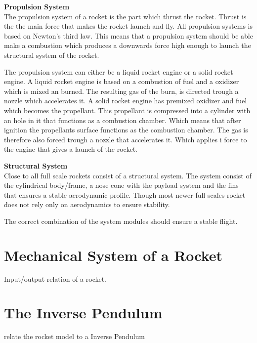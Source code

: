 \textbf{Propulsion System}\\
The propulsion system of a rocket is the part which thrust the rocket. Thrust is the the main force that makes the rocket launch and fly. All propulsion systems is based on Newton's third law. This means that a propulsion system should be able make a combustion which produces a downwards force high enough to launch the structural system of the rocket.


The propulsion system can either be a liquid rocket engine or a solid rocket engine. A liquid rocket engine is based on a combustion of fuel and a oxidizer which is mixed an burned. The resulting gas of the burn, is directed trough a nozzle which accelerates it.
A solid rocket engine has premixed oxidizer and fuel which becomes the propellant. This propellant is compressed into a cylinder with an hole in it that functions as a combustion chamber. Which means that after ignition the propellants surface functions as the combustion chamber. The gas is therefore also forced trough a nozzle that accelerates it. Which applies i force to the engine that gives a launch of the rocket. 


\textbf{Structural System}\\
Close to all full scale rockets consist of a structural system. The system consist of the cylindrical body/frame, a nose cone with the payload system and the fins that ensures a stable aerodynamic profile. Though most newer full scales rocket does not rely only on aerodynamics to ensure stability\cite{web:RocketStructure}.
\bigbreak   

The correct combination of the system modules should ensure a stable flight.  



\section{Mechanical System of a Rocket}
Input/output relation of a rocket.
\section{The Inverse Pendulum}
relate the rocket model to a Inverse Pendulum